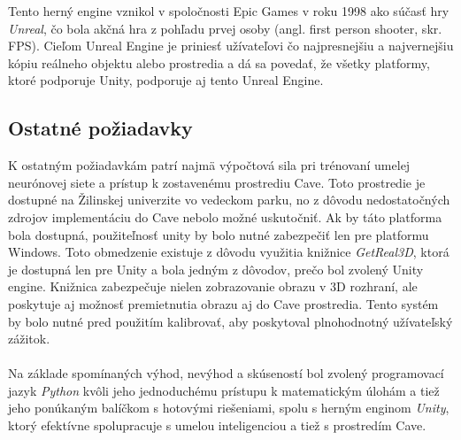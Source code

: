 Tento herný engine vznikol v spoločnosti Epic Games v roku 1998 ako súčasť hry \emph{Unreal}, čo bola akčná hra z
pohľadu prvej osoby (angl. first person shooter, skr. FPS).
Cieľom Unreal Engine je priniesť užívateľovi čo najpresnejšiu a najvernejšiu kópiu reálneho objektu alebo prostredia
a dá sa povedať, že všetky platformy, ktoré podporuje Unity, podporuje aj tento Unreal Engine.

\subsection{Ostatné požiadavky}\label{subsec:requirements-other}

K ostatným požiadavkám patrí najmä výpočtová sila pri trénovaní umelej neurónovej siete a prístup k zostavenému
prostrediu Cave.
Toto prostredie je dostupné na Žilinskej univerzite vo vedeckom parku, no z dôvodu nedostatočných zdrojov implementáciu
do Cave nebolo možné uskutočniť.
Ak by táto platforma bola dostupná, použiteľnosť unity by bolo nutné zabezpečiť len pre platformu Windows.
Toto obmedzenie existuje z dôvodu využitia knižnice \emph{GetReal3D}\cite{getreal3d}, ktorá je dostupná len pre Unity
a bola jedným z dôvodov, prečo bol zvolený Unity engine.
Knižnica zabezpečuje nielen zobrazovanie obrazu v 3D rozhraní, ale poskytuje aj možnosť premietnutia obrazu aj do Cave
prostredia.
Tento systém by bolo nutné pred použitím kalibrovať, aby poskytoval plnohodnotný užívateľský zážitok.
\\
\\
Na základe spomínaných výhod, nevýhod a skúseností bol zvolený programovací jazyk \emph{Python} kvôli jeho jednoduchému
prístupu k matematickým úlohám a tiež jeho ponúkaným balíčkom s hotovými riešeniami, spolu s herným enginom
\emph{Unity}, ktorý efektívne spolupracuje s umelou inteligenciou a tiež s prostredím Cave.

